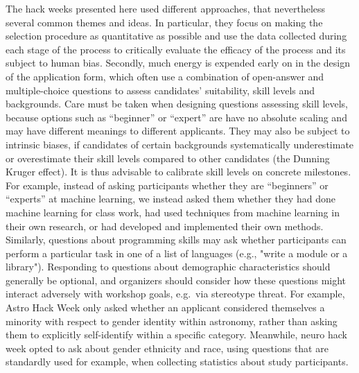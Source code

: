 \documentclass{nature}
\begin{document}
The hack weeks presented here used different approaches, that nevertheless several common themes and ideas. In particular, they focus on making the selection procedure as quantitative as possible and use the data collected during each stage of the process to critically evaluate the efficacy of the process and its subject to human bias.
Secondly, much energy is expended early on in the design of the application form, which often use a combination of open-answer and multiple-choice questions to assess candidates' suitability, skill levels and backgrounds. Care must be taken when designing questions assessing skill levels, because options such as ``beginner'' or ``expert'' are have no absolute scaling and may have different meanings to different applicants. They may also be subject to intrinsic biases, if candidates of certain backgrounds systematically underestimate or overestimate their skill levels compared to other candidates (the Dunning Kruger effect). It is thus advisable to calibrate skill levels on concrete milestones. For example, instead of asking participants whether they are ``beginners'' or ``experts'' at machine learning, we instead asked them whether they had done machine learning for class work, had used techniques from machine learning in their own research, or had developed and implemented their own methods. Similarly, questions about programming skills may ask whether participants can perform a particular task in one of a list of languages  (e.g., "write a module or a library"). Responding to questions about demographic characteristics should generally be optional, and organizers should consider how these questions might interact adversely with workshop goals, e.g.\ via stereotype threat. For example, Astro Hack Week only asked whether an applicant considered themselves a minority with respect to gender identity within astronomy, rather than asking them to explicitly self-identify within a specific category. Meanwhile, neuro hack week opted to ask about gender ethnicity and race, using questions that are standardly used for example, when collecting statistics about study participants.
\end{document}
